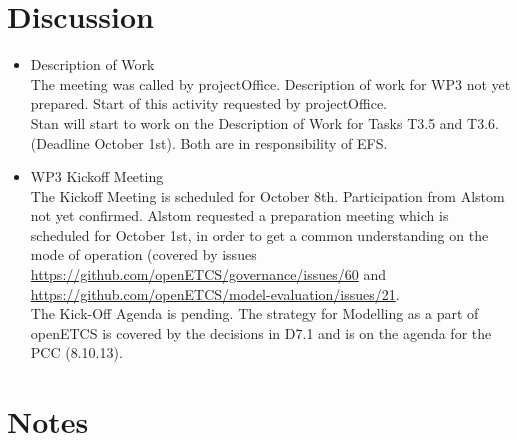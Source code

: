 \documentclass[a4paper, 11pt]{article}
\begin{document}
\section{Discussion}
\begin{itemize}

\item Description of Work\\
The meeting was called by projectOffice. Description of work for WP3 not yet prepared. Start of this activity requested by projectOffice.\\
Stan will start to work on the Description of Work for Tasks T3.5 and T3.6. (Deadline October 1st). Both are in responsibility of EFS.

\item WP3 Kickoff Meeting\\
The Kickoff Meeting is scheduled for October 8th. Participation from Alstom not yet confirmed. Alstom requested a preparation meeting which is scheduled for October 1st, in order to get a common understanding on the mode of operation (covered by issues \url{https://github.com/openETCS/governance/issues/60} and\\ \url{https://github.com/openETCS/model-evaluation/issues/21}.\\
The Kick-Off Agenda is pending. The strategy for Modelling as a part of openETCS is covered by the decisions in D7.1 and is on the agenda for the PCC (8.10.13).

\end{itemize}


\section{Notes}
\end{document}
